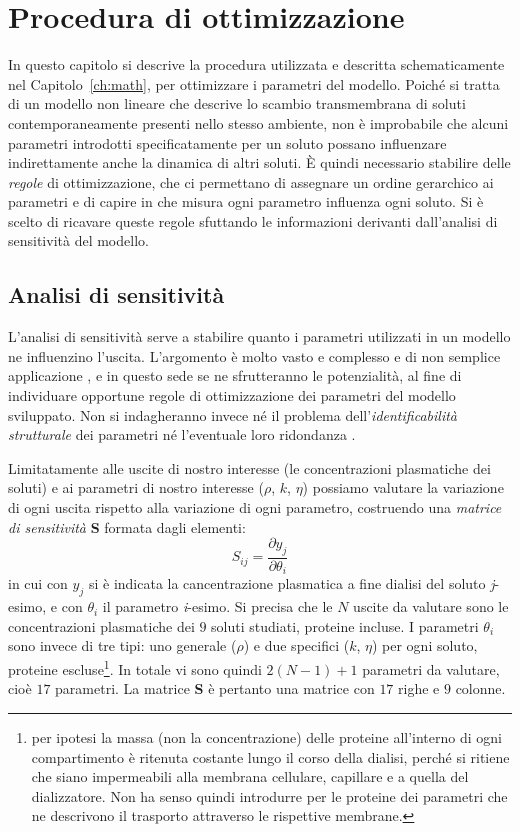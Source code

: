 \chapter{Procedura di ottimizzazione}\label{ch:ottimizzazione}
In questo capitolo si descrive la procedura utilizzata e descritta schematicamente nel Capitolo~\ref{ch:math}, per ottimizzare i parametri del modello. Poiché si tratta di un modello non lineare che descrive lo scambio transmembrana di soluti contemporaneamente presenti nello stesso ambiente, non è improbabile che alcuni parametri introdotti specificatamente per un soluto possano influenzare indirettamente anche la dinamica di altri soluti. È quindi necessario stabilire delle \textit{regole} di ottimizzazione, che ci permettano di assegnare un ordine gerarchico ai parametri e di capire in che misura ogni parametro influenza ogni soluto. Si è scelto di ricavare queste regole sfuttando le informazioni derivanti dall'analisi di sensitività del modello.

\section{Analisi di sensitività}\label{sec:sensitivity}
L'analisi di sensitività serve a stabilire quanto i parametri utilizzati in un modello ne influenzino l'uscita. L'argomento è molto vasto e complesso e di non semplice applicazione \cite{bib:sensitivity, hemez, myung}, e in questo sede se ne sfrutteranno le potenzialità, al fine di individuare opportune regole di ottimizzazione dei parametri del modello sviluppato. Non si indagheranno invece né il problema dell'\textit{identificabilità strutturale} dei parametri né l'eventuale loro ridondanza \cite{khoo}.

Limitatamente alle uscite di nostro interesse (le concentrazioni plasmatiche dei soluti) e ai parametri di nostro interesse ($\rho$, $k$, $\eta$) possiamo valutare la variazione di ogni uscita rispetto alla variazione di ogni parametro, costruendo una \textit{matrice di sensitività} \textbf{S} formata dagli elementi:
$$S_{ij}=\frac{\partial y_j}{\partial \theta_i}$$
in cui con $y_j$ si è indicata la cancentrazione plasmatica a fine dialisi del soluto \textit{j}-esimo, e con $\theta_i$ il parametro \textit{i}-esimo. Si precisa che le $N$ uscite da valutare sono le concentrazioni plasmatiche dei $9$ soluti studiati, proteine incluse. I parametri $\theta_i$ sono invece di tre tipi: uno generale ($\rho$) e due specifici ($k$, $\eta$) per ogni soluto, proteine escluse\footnote{per ipotesi la massa (non la concentrazione) delle proteine all'interno di ogni compartimento è ritenuta costante lungo il corso della dialisi, perché si ritiene che siano impermeabili alla membrana cellulare, capillare e a quella del dializzatore. Non ha senso quindi introdurre per le proteine dei parametri che ne descrivono il trasporto attraverso le rispettive membrane.}. In totale vi sono quindi $2(N-1)+1$ parametri da valutare, cioè $17$ parametri. La matrice \textbf{S} è pertanto una matrice con $17$ righe e $9$ colonne.

